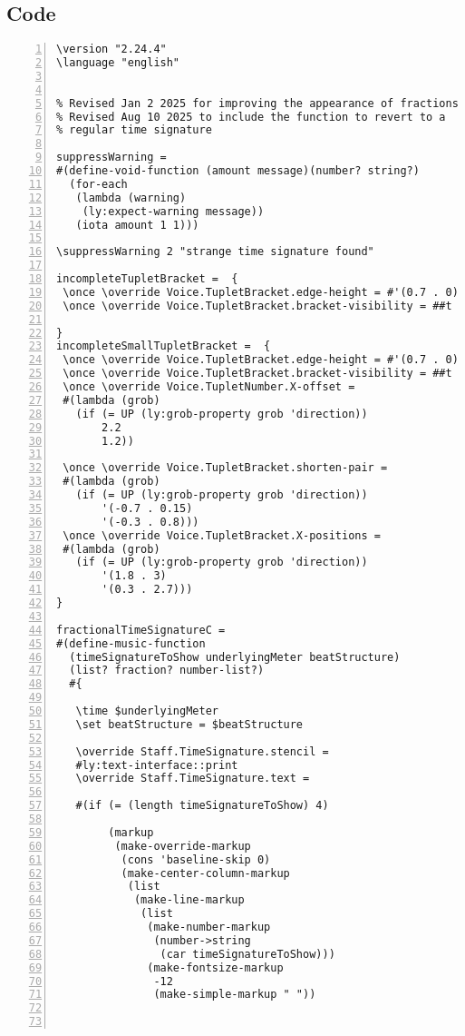 \subsection{Code}
\begin{Verbatim}[numbers=left,xleftmargin=5mm]
\version "2.24.4"
\language "english"


% Revised Jan 2 2025 for improving the appearance of fractions
% Revised Aug 10 2025 to include the function to revert to a
% regular time signature

suppressWarning =
#(define-void-function (amount message)(number? string?)
  (for-each
   (lambda (warning)
    (ly:expect-warning message))
   (iota amount 1 1)))

\suppressWarning 2 "strange time signature found"

incompleteTupletBracket =  {
 \once \override Voice.TupletBracket.edge-height = #'(0.7 . 0)
 \once \override Voice.TupletBracket.bracket-visibility = ##t

}
incompleteSmallTupletBracket =  {
 \once \override Voice.TupletBracket.edge-height = #'(0.7 . 0)
 \once \override Voice.TupletBracket.bracket-visibility = ##t
 \once \override Voice.TupletNumber.X-offset =
 #(lambda (grob)
   (if (= UP (ly:grob-property grob 'direction))
       2.2
       1.2))

 \once \override Voice.TupletBracket.shorten-pair =
 #(lambda (grob)
   (if (= UP (ly:grob-property grob 'direction))
       '(-0.7 . 0.15)
       '(-0.3 . 0.8)))
 \once \override Voice.TupletBracket.X-positions =
 #(lambda (grob)
   (if (= UP (ly:grob-property grob 'direction))
       '(1.8 . 3)
       '(0.3 . 2.7)))
}

fractionalTimeSignatureC =
#(define-music-function
  (timeSignatureToShow underlyingMeter beatStructure)
  (list? fraction? number-list?)
  #{

   \time $underlyingMeter
   \set beatStructure = $beatStructure

   \override Staff.TimeSignature.stencil =
   #ly:text-interface::print
   \override Staff.TimeSignature.text =

   #(if (= (length timeSignatureToShow) 4)

        (markup
         (make-override-markup
          (cons 'baseline-skip 0)
          (make-center-column-markup
           (list
            (make-line-markup
             (list
              (make-number-markup
               (number->string
                (car timeSignatureToShow)))
              (make-fontsize-markup
               -12
               (make-simple-markup " "))



\end{Verbatim}
